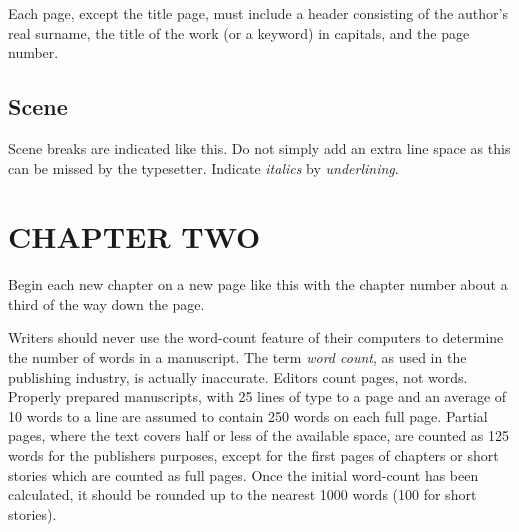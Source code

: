 Each page, except the title page, must include a header
consisting of the author's real surname, the title of the
work (or a keyword) in capitals, and the page number.

\section{Scene}
\label{scene}

Scene breaks are indicated like this. Do not simply
add an extra line space as this can be missed by the
typesetter. Indicate \emph{italics} by \emph{underlining}. 

\chapter{CHAPTER TWO}
\label{chaptertwo}

Begin each new chapter on a new page like this with the
chapter number about a third of the way down the page. 

Writers should never use the word-count feature of
their computers to determine the number of words in a
manuscript. The term \emph{word count}, as used in the publishing
industry, is actually inaccurate. Editors count pages, not
words. Properly prepared manuscripts, with 25 lines of type
to a page and an average of 10 words to a line are assumed
to contain 250 words on each full page. Partial pages,
where the text covers half or less of the available space,
are counted as 125 words for the publishers purposes, except
for the first pages of chapters or short stories which are
counted as full pages. Once the initial word-count has been
calculated, it should be rounded up to the nearest 1000
words (100 for short stories). 




